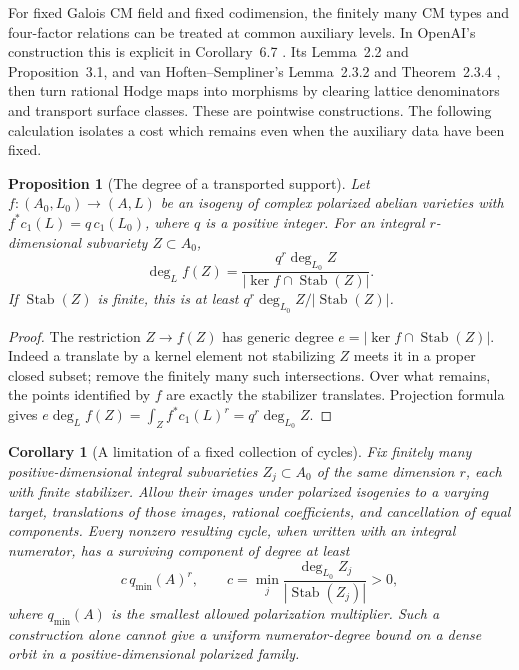 \documentclass[11pt]{article}
\newtheorem{proposition}[theorem]{Proposition}
\newtheorem{corollary}[theorem]{Corollary}
\theoremstyle{definition}
\theoremstyle{remark}
\begin{document}
For fixed Galois CM field and fixed codimension, the finitely many CM types and four-factor relations can be treated at common auxiliary levels. In OpenAI's construction this is explicit in Corollary~6.7 \cite{OpenAICM}. Its Lemma~2.2 and Proposition~3.1, and van Hoften--Sempliner's Lemma~2.3.2 and Theorem~2.3.4 \cite{vHS}, then turn rational Hodge maps into morphisms by clearing lattice denominators and transport surface classes. These are pointwise constructions. The following calculation isolates a cost which remains even when the auxiliary data have been fixed.

\begin{proposition}[The degree of a transported support]\label{prop:transport}
Let $f:(A_0,L_0)\to(A,L)$ be an isogeny of complex polarized abelian varieties with $f^*c_1(L)=q\,c_1(L_0)$, where $q$ is a positive integer. For an integral $r$-dimensional subvariety $Z\subset A_0$,
\[
 \deg_L f(Z)=
 \frac{q^r\deg_{L_0}Z}
 {|\ker f\cap\operatorname{Stab}(Z)|}.
\]
If $\operatorname{Stab}(Z)$ is finite, this is at least
$q^r\deg_{L_0}Z/|\operatorname{Stab}(Z)|$.
\end{proposition}

\begin{proof}
The restriction $Z\to f(Z)$ has generic degree
$e=|\ker f\cap\operatorname{Stab}(Z)|$. Indeed a translate by a kernel element not stabilizing $Z$ meets it in a proper closed subset; remove the finitely many such intersections. Over what remains, the points identified by $f$ are exactly the stabilizer translates. Projection formula gives
$e\deg_L f(Z)=\int_Zf^*c_1(L)^r=q^r\deg_{L_0}Z$.
\end{proof}

\begin{corollary}[A limitation of a fixed collection of cycles]\label{cor:fixed-catalog}
Fix finitely many positive-dimensional integral subvarieties $Z_j\subset A_0$ of the same dimension $r$, each with finite stabilizer. Allow their images under polarized isogenies to a varying target, translations of those images, rational coefficients, and cancellation of equal components. Every nonzero resulting cycle, when written with an integral numerator, has a surviving component of degree at least
\[
 c\,q_{\min}(A)^r,\qquad
 c=\min_j\frac{\deg_{L_0}Z_j}{|\operatorname{Stab}(Z_j)|}>0,
\]
where $q_{\min}(A)$ is the smallest allowed polarization multiplier. Such a construction alone cannot give a uniform numerator-degree bound on a dense orbit in a positive-dimensional polarized family.
\end{corollary}
\end{document}
